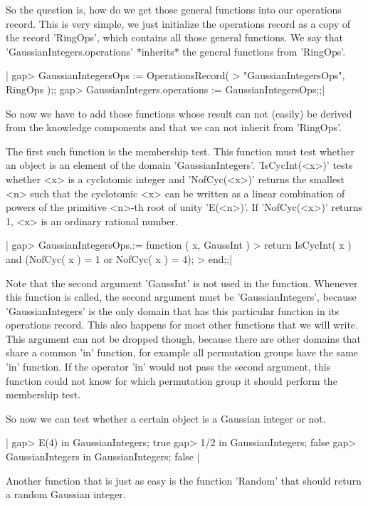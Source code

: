 So the question is,  how do  we get  those  general  functions  into  our
operations  record.   This  is  very  simple,  we  just  initialize   the
operations  record as a copy of the record  'RingOps', which contains all
those  general  functions.   We  say  that  'GaussianIntegers.operations'
*inherits* the general functions from 'RingOps'.

|    gap> GaussianIntegersOps := OperationsRecord(
    >        "GaussianIntegersOps", RingOps );;
    gap> GaussianIntegers.operations := GaussianIntegersOps;;|

So now we have  to add those functions whose  result can not (easily)  be
derived from the knowledge  components and that we can  not  inherit from
'RingOps'.

The first such function is the membership test.  This  function must test
whether  an  object  is  an  element  of  the  domain 'GaussianIntegers'.
'IsCycInt(<x>)'  tests   whether   <x>  is   a  cyclotomic   integer  and
'NofCyc(<x>)'  returns the smallest <n> such that  the cyclotomic <x> can
be written as a linear combination of powers of the primitive <n>-th root
of  unity  'E(<n>)'.  If  'NofCyc(<x>)'  returns  1,  <x> is an  ordinary
rational number.

|    gap> GaussianIntegersOps.\in := function ( x, GaussInt )
    >    return IsCycInt( x ) and (NofCyc( x ) = 1 or NofCyc( x ) = 4);
    > end;;|

Note that  the second  argument  'GaussInt' is not used in  the function.
Whenever   this  function  is  called,   the  second  argument  must   be
'GaussianIntegers', because 'GaussianIntegers' is the  only  domain  that
has this particular function in its operations record.  This also happens
for most  other  functions that we will write.  This argument can not  be
dropped though, because there are  other domains that share a common 'in'
function, for example all permutation groups have the same 'in' function.
If the operator 'in' would not pass  the second  argument,  this function
could  not  know  for which  permutation  group  it  should  perform  the
membership test.

So now we can test whether a certain object is a Gaussian integer or not.

|    gap> E(4) in GaussianIntegers;
    true
    gap> 1/2 in GaussianIntegers;
    false
    gap> GaussianIntegers in GaussianIntegers;
    false |

Another function that  is  just as  easy is the  function  'Random'  that
should return a random Gaussian integer.

